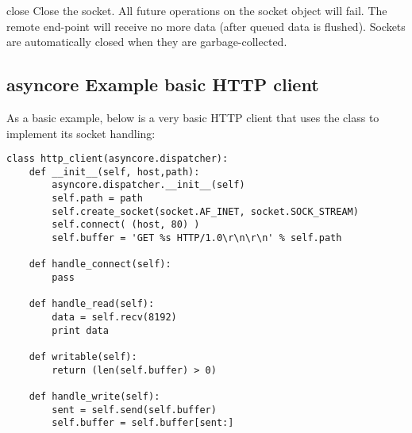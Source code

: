 \begin{methoddesc}{close}{}
  Close the socket.  All future operations on the socket object
  will fail.  The remote end-point will receive no more data (after
  queued data is flushed).  Sockets are automatically closed
  when they are garbage-collected.
\end{methoddesc}


\subsection{asyncore Example basic HTTP client \label{asyncore-example}}

As a basic example, below is a very basic HTTP client that uses the 
 class to implement its socket handling:

\begin{verbatim}
class http_client(asyncore.dispatcher):
    def __init__(self, host,path):
        asyncore.dispatcher.__init__(self)
        self.path = path
        self.create_socket(socket.AF_INET, socket.SOCK_STREAM)
        self.connect( (host, 80) )
        self.buffer = 'GET %s HTTP/1.0\r\n\r\n' % self.path
        
    def handle_connect(self):
        pass
        
    def handle_read(self):
        data = self.recv(8192)
        print data
        
    def writable(self):
        return (len(self.buffer) > 0)
    
    def handle_write(self):
        sent = self.send(self.buffer)
        self.buffer = self.buffer[sent:]
\end{verbatim}
